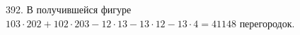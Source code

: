 392. В получившейся фигуре $103\cdot202+102\cdot203-12\cdot13-13\cdot12-13\cdot4=41148$ перегородок.\\
